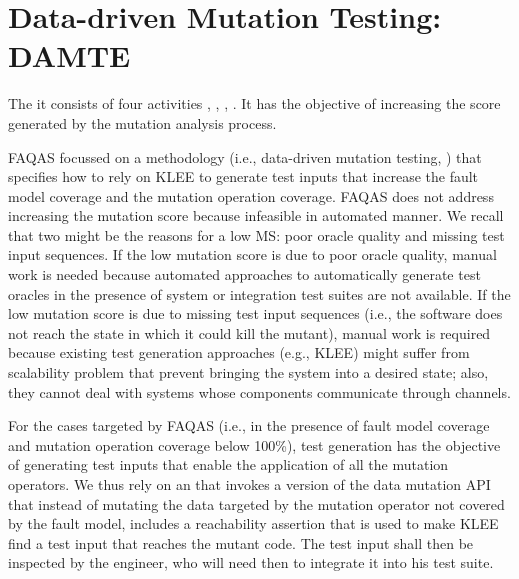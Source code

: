 



\section{Data-driven Mutation Testing: DAMTE} %
\label{sec:data:test_suite_augmentation}



The  it consists of four activities , , , . It has the objective of increasing the score generated by the mutation analysis process.

FAQAS focussed on a methodology (i.e., data-driven mutation testing, ) that specifies how to rely on KLEE to generate test inputs that increase the fault model coverage and the mutation operation coverage.
FAQAS does not address increasing the mutation score because infeasible in automated manner.
We recall that two might be the reasons for a low MS: poor oracle quality and missing test input sequences.
If the low mutation score is due to poor oracle quality, manual work is needed because automated approaches to automatically generate test oracles in the presence of system or integration test suites are not available. 
If the low mutation score is due to missing test input sequences (i.e., the software does not reach the state in which it could kill the mutant), manual work is required because existing test generation approaches (e.g., KLEE) might suffer from scalability problem that prevent bringing the system into a desired state; also, they cannot deal with systems whose components communicate through channels. 

For the cases targeted by FAQAS (i.e.,
in the presence of fault model coverage and mutation operation coverage below 100\%), test generation has the objective of generating test inputs that enable the application of all the mutation operators. 
We thus rely on an   that
invokes a version of the data mutation API that instead of mutating the data targeted by the mutation operator not covered by the fault model, includes a reachability assertion that is used to make KLEE find a test input that reaches the mutant code. The test input shall then be inspected by the engineer, who will need then to integrate it into his test suite.
%
%
%
%







